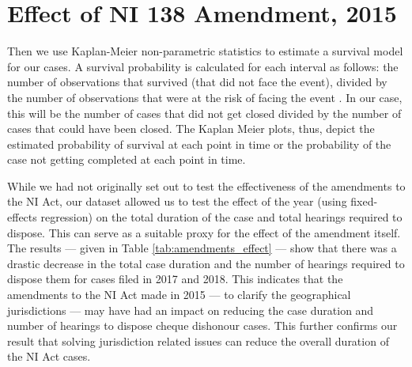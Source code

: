 \section{Effect of NI 138 Amendment, 2015}

Then we use Kaplan-Meier non-parametric statistics to estimate a survival model for our cases. A survival probability is calculated for each interval as follows: the number of observations that survived (that did not face the event), divided by the number of observations that were at the risk of facing the event \autocite{rich2010practical}. In our case, this will be the number of cases that did not get closed divided by the number of cases that could have been closed. The Kaplan Meier plots, thus, depict the estimated probability of survival at each point in time or the probability of the case not getting completed at each point in time.

While we had not originally set out to test the effectiveness of the amendments to the NI Act, our dataset allowed us to test the effect of the year (using fixed-effects regression) on the total duration of the case and total hearings required to dispose. This can serve as a suitable proxy for the effect of the amendment itself. The results --- given in Table \ref{tab:amendments_effect} --- show that there was a drastic decrease in the total case duration and the number of hearings required to dispose them for cases filed in 2017 and 2018. This indicates that the amendments to the NI Act made in 2015 --- to clarify the geographical jurisdictions --- may have had an impact on reducing the case duration and number of hearings to dispose cheque dishonour cases. This further confirms our result that solving jurisdiction related issues can reduce the overall duration of the NI Act cases.

